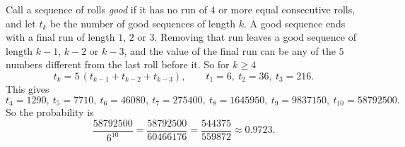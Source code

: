 Call a sequence of rolls \emph{good} if it has no run of $4$ or more equal consecutive rolls, and let $t_k$ be the number of good sequences of length $k$. A good sequence ends with a final run of length $1$, $2$ or $3$. Removing that run leaves a good sequence of length $k-1$, $k-2$ or $k-3$, and the value of the final run can be any of the $5$ numbers different from the last roll before it. So for $k\ge4$
\[
t_k=5\,(t_{k-1}+t_{k-2}+t_{k-3}),\qquad t_1=6,\ t_2=36,\ t_3=216 .
\]
This gives
\[
t_4=1290,\ t_5=7710,\ t_6=46080,\ t_7=275400,\ t_8=1645950,\ t_9=9837150,\ t_{10}=58792500 .
\]
So the probability is
\[
\dfrac{58792500}{6^{10}}=\dfrac{58792500}{60466176}=\boxed{\dfrac{544375}{559872}}\approx0.9723 .
\]
